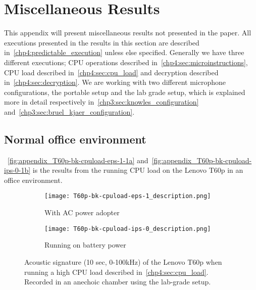 \chapter{Miscellaneous Results}\label{apx:results}
This appendix will present miscellaneous results not presented in the paper.
All executions presented in the results in this section are described in~\autoref{chp4:predictable_execution} unless else specified. 
Generally we have three different executions; CPU operations described in~\autoref{chp4:sec:microinstructions}, CPU load described in~\autoref{chp4:sec:cpu_load} and decryption described in~\autoref{chp4:sec:decryption}. 
We are working with two different microphone configurations, the portable setup and the lab grade setup, which is explained more in detail respectively in~\autoref{chp3:sec:knowles_configuration} and~\autoref{chp3:sec:bruel_kjaer_configuration}.

\section{Normal office environment}

~\autoref{fig:appendix_T60p-bk-cpuload-eps-1-1a} and~\autoref{fig:appendix_T60p-bk-cpuload-ips-0-1b} is the results from the running CPU load on the Lenovo T60p in an office environment. 
\begin{figure}[ht]
	\begin{subfigure}{1\textwidth}
	    \centering
	    \texttt{[image: T60p-bk-cpuload-eps-1\_description.png]}
	    \caption{With AC power adopter}
	    \label{fig:appendix_T60p-bk-cpuload-eps-1-1a}
    \end{subfigure}
    \begin{subfigure}{1\textwidth}
	    \centering
	    \texttt{[image: T60p-bk-cpuload-ips-0\_description.png]}
	    \caption{Running on battery power}
	    \label{fig:appendix_T60p-bk-cpuload-ips-0-1b}
    \end{subfigure}
    \caption{Acoustic signature (10 sec, 0-100kHz) of the Lenovo T60p when running a high CPU load described in~\autoref{chp4:sec:cpu_load}. Recorded in an anechoic chamber using the lab-grade setup. }
	\label{fig:appendix_T60p-bk-cpuload}
\end{figure}


